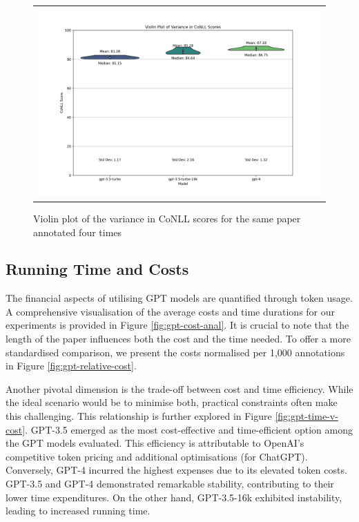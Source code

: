 \begin{figure}[htpb]
  \centering
  \begin{tabular}{c}
  \includegraphics[width=14cm]{images/variance-conll.png}
  \end{tabular}
  \caption[The variance]{Violin plot of the variance in CoNLL scores for the same paper annotated four times}\label{fig:violin-variance}
\end{figure}

\subsection{Running Time and Costs}

The financial aspects of utilising GPT models are quantified through token usage. A comprehensive visualisation of the average costs and time durations for our experiments is provided in Figure \ref{fig:gpt-cost-anal}. It is crucial to note that the length of the paper influences both the cost and the time needed. To offer a more standardised comparison, we present the costs normalised per 1,000 annotations in Figure \ref{fig:gpt-relative-cost}.

Another pivotal dimension is the trade-off between cost and time efficiency. While the ideal scenario would be to minimise both, practical constraints often make this challenging. This relationship is further explored in Figure \ref{fig:gpt-time-v-cost}.
GPT-3.5 emerged as the most cost-effective and time-efficient option among the GPT models evaluated. This efficiency is attributable to OpenAI's competitive token pricing and additional optimisations (for ChatGPT). Conversely, GPT-4 incurred the highest expenses due to its elevated token costs. GPT-3.5 and GPT-4 demonstrated remarkable stability, contributing to their lower time expenditures. On the other hand, GPT-3.5-16k exhibited instability, leading to increased running time. %

